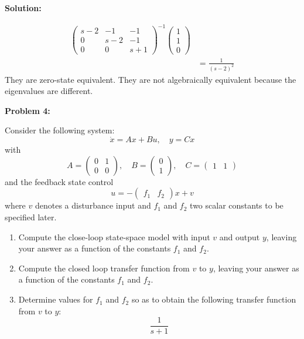 \documentclass[12pt]{article}
\newenvironment{problem}[1]{
    \textbf{Problem #1:}
}{
    \rmfamily \vspace{1em}
}
\newenvironment{solution}{
    \textbf{Solution:}
    
}{
    
    \vspace{2em}
}
\begin{document}
\begin{solution}
\[\begin{aligned}
            \begin{pmatrix}
                s - 2 & -1 & -1 \\
            0 & s - 2 & -1 \\
                0 & 0 & s + 1
            \end{pmatrix}^{-1}
            \begin{pmatrix}
                1 \\
                1 \\
                0
            \end{pmatrix}\\
            &= \frac{1}{(s-2)^2}
        \end{aligned}
    \]
    They are zero-state equivalent. They are not algebraically equivalent because the eigenvalues are different.

\end{solution}

\newpage

\begin{problem}{4}
    Consider the following system:
    \[
        \dot{x} = Ax + Bu, \quad y = Cx
    \]
    with
    \[
        A = \begin{pmatrix}
            0 & 1 \\
            0 & 0
        \end{pmatrix}, \quad B = \begin{pmatrix}
            0 \\
            1
        \end{pmatrix}, \quad C = \begin{pmatrix}
            1 & 1
        \end{pmatrix}
    \]
    and the feedback state control
    \[
        u = - \begin{pmatrix}
            f_1 & f_2
        \end{pmatrix}x + v
    \]
    where \(v\) denotes a disturbance input and \(f_1\) and \(f_2\) two scalar constants to be
    specified later.
    \begin{enumerate}[label=(\alph*)]
        \item Compute the close-loop state-space model with input \(v\) and output \(y\),
        leaving your answer as a function of the constants \(f_1\) and \(f_2\).
        \item Compute the closed loop transfer function from \(v\) to \(y\), leaving your answer as a function of the constants \(f_1\) and \(f_2\).
        \item Determine values for \(f_1\) and \(f_2\) so as to obtain the following transfer function from \(v\) to \(y\):
        \[
            \frac{1}{s+1}
        \]
    \end{enumerate}
\end{problem}
\end{document}
